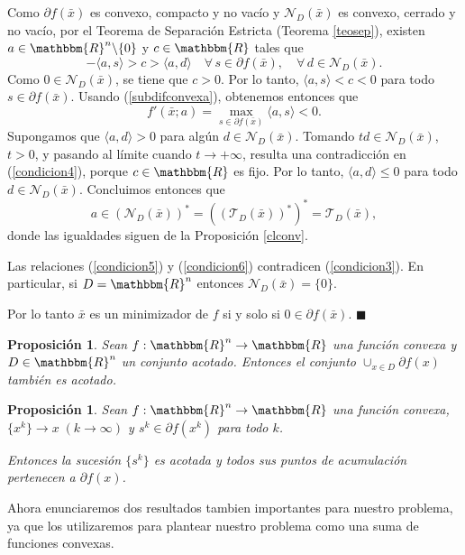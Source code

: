 \documentclass[a4paper,12pt]{report}
\newcommand{\la}{\langle}
\newcommand{\ra}{\rangle}
\newcommand{\RR}{\mathbbm{R}}
\newcommand{\Rn}{\RR^n}
\newcommand{\bx}{\bar{x}}
\newcommand{\sdif}{\partial f(x)}
\newcommand{\sdf}{\partial f(\bx)}
\newcommand{\cN}{\mathcal{N}}
\newcommand{\cT}{\mathcal{T}}
\newcommand{\arr}{\rightarrow}
\newcommand{\frnr}{f:\Rn\arr\RR}
\newtheorem{prop}[teo]{Proposici\'on}
\newenvironment{dem}{\vspace*{-0.1cm}{\it Demostraci\'on:}}{\hfill
$\blacksquare$\\}
\begin{document}
\begin{dem}
Como $\sdf$ es convexo, compacto y no vac\'io y $\cN_{D}(\bx)$ es convexo, cerrado y no vac\'io, por el Teorema de Separaci\'on Estricta (Teorema \ref{teosep}), existen $a\in\Rn\backslash\{0\}$ y $c\in\RR$ tales que 
\begin{equation}\label{condicion4}
-\la a,s\ra >c>\la a,d\ra\quad\forall\,s\in\sdf,\quad\forall\,d\in\cN_{D}(\bx).
\end{equation}
Como $0\in\cN_{D}(\bx)$, se tiene que $c>0$. Por lo tanto, $\la a,s\ra<c<0$ para todo $s\in\sdf$. Usando (\ref{subdifconvexa}), obtenemos entonces que
\begin{equation}\label{condicion5}
f'(\bx;a)=\max_{s\in\sdf}\la a,s \ra <0.
\end{equation}
Supongamos que $\la a,d\ra>0$ para alg\'un $d\in\cN_{D}(\bx)$. Tomando $td\in\cN_{D}(\bx)$, $t>0$, y pasando al l\'imite cuando $t\arr +\infty$, resulta una contradicci\'on en (\ref{condicion4}), porque $c\in\RR$ es fijo. Por lo tanto, $\la a,d\ra \leq 0$ para todo $d\in\cN_{D}(\bx)$. Concluimos entonces que
\begin{equation}\label{condicion6}
a\in(\cN_{D}(\bx))^*=((\cT_{D}(\bx))^*)^*=\cT_{D}(\bx),
\end{equation}
donde las igualdades siguen de la Proposici\'on \ref{clconv}.

Las relaciones (\ref{condicion5}) y (\ref{condicion6}) contradicen (\ref{condicion3}).
En particular, si $D=\Rn$ entonces $\cN_D(\bx)=\{0\}$.

Por lo tanto $\bx$ es un minimizador de $f$ si y solo si $0\in\sdf$.
\end{dem}

\begin{prop}\label{subdif_acotado}
Sean $\frnr$ una funci\'on convexa y $D\in\Rn$ un conjunto acotado.
Entonces el conjunto $\displaystyle{\mathop{\cup}_{x\in D}\sdif}$ tambi\'en es acotado.
\end{prop}

\begin{prop}
Sean $\frnr$ una funci\'on convexa, $\{x^{k}\}\arr x\;(k\arr\infty)$ y $s^{k} \in\partial f(x^k)$ para todo $k$.

Entonces la sucesi\'on $\{s^k\}$ es acotada y todos sus puntos de acumulaci\'on pertenecen a $\sdif$.
\end{prop}

Ahora enunciaremos dos resultados tambien importantes para nuestro problema, ya que los utilizaremos para plantear nuestro problema como una suma de funciones convexas.
\end{document}
